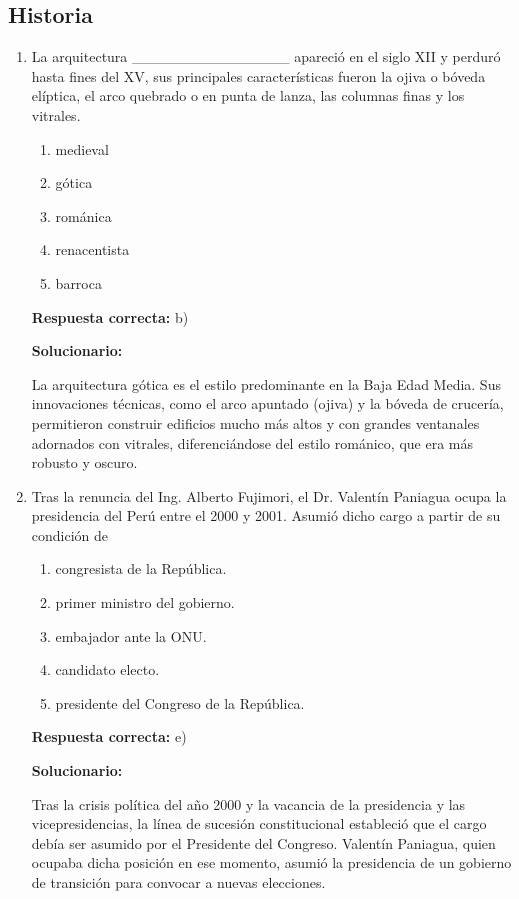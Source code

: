 \subsection*{Historia}

\begin{enumerate}[resume]
	
\item La arquitectura \_\_\_\_\_\_\_\_\_\_\_\_\_\_\_ apareció en el siglo XII y perduró hasta fines del XV, sus principales características fueron la ojiva o bóveda elíptica, el arco quebrado o en punta de lanza, las columnas finas y los vitrales.

\begin{enumerate}[label=\alph*)]
	\item medieval
	\item gótica
	\item románica
	\item renacentista
	\item barroca
\end{enumerate}

\textbf{Respuesta correcta:} b)

\vspace{2mm}
\textbf{Solucionario:}

La arquitectura gótica es el estilo predominante en la Baja Edad Media. Sus innovaciones técnicas, como el arco apuntado (ojiva) y la bóveda de crucería, permitieron construir edificios mucho más altos y con grandes ventanales adornados con vitrales, diferenciándose del estilo románico, que era más robusto y oscuro.

\vspace{6mm}

\item Tras la renuncia del Ing. Alberto Fujimori, el Dr. Valentín Paniagua ocupa la presidencia del Perú entre el 2000 y 2001. Asumió dicho cargo a partir de su condición de

\begin{enumerate}[label=\alph*)]
	\item congresista de la República.
	\item primer ministro del gobierno.
	\item embajador ante la ONU.
	\item candidato electo.
	\item presidente del Congreso de la República.
\end{enumerate}

\textbf{Respuesta correcta:} e)

\vspace{2mm}
\textbf{Solucionario:}

Tras la crisis política del año 2000 y la vacancia de la presidencia y las vicepresidencias, la línea de sucesión constitucional estableció que el cargo debía ser asumido por el Presidente del Congreso. Valentín Paniagua, quien ocupaba dicha posición en ese momento, asumió la presidencia de un gobierno de transición para convocar a nuevas elecciones.

\vspace{6mm}	
	
\end{enumerate}




